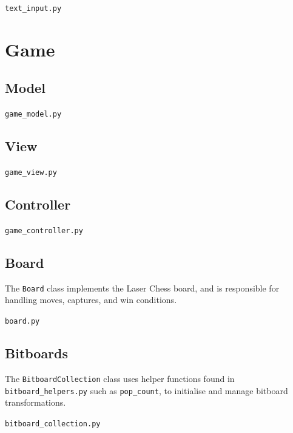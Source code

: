 \documentclass[../main/main.tex]{subfiles}
\begin{document}
\noindent\verb|text_input.py|


\section{Game}
\subsection{Model}
\noindent\verb|game_model.py|


\subsection{View}
\noindent\verb|game_view.py|


\subsection{Controller}
\noindent\verb|game_controller.py|


\subsection{Board}
The \lstinline{Board} class implements the Laser Chess board, and is responsible for handling moves, captures, and win conditions.

\noindent\verb|board.py|


\subsection{Bitboards}
\label{sec:bitboards}
The \lstinline{BitboardCollection} class uses helper functions found in \lstinline{bitboard_helpers.py} such as \lstinline{pop_count}, to initialise and manage bitboard transformations.

\noindent\verb|bitboard_collection.py|

\end{document}
